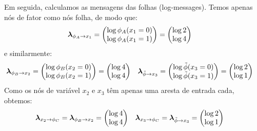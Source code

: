 \begin{exenumerate}
\begin{solution}
        Em seguida, calculamos as mensagens das folhas (log-messages). Temos apenas n\'os de fator como n\'os folha, de modo que:
        \begin{align}
            \boldsymbol{\lambda}_{\phi_A \to x_1} & =  \begin{pmatrix}
                \log \phi_A(x_1=0)\\
                \log \phi_A(x_1=1)
            \end{pmatrix}
            = \begin{pmatrix}
                \log 2\\
                \log 4
            \end{pmatrix}
        \end{align}
        e similarmente:
        \begin{align}
            \boldsymbol{\lambda}_{\phi_B \to x_2} & =   \begin{pmatrix}
                \log \phi_B(x_2=0)\\
                \log \phi_B(x_2=1)
            \end{pmatrix} = \begin{pmatrix}
                \log 4\\
                \log 4
            \end{pmatrix}
            &
            \boldsymbol{\lambda}_{\tilde{\phi} \to x_3} & =   \begin{pmatrix}
                \log \tilde{\phi}(x_3=0)\\
                \log \tilde{\phi}(x_3=1)
            \end{pmatrix}= \begin{pmatrix}
                \log 2\\
                \log 1
            \end{pmatrix}
        \end{align}
        Como os n\'os de vari\'avel $x_2$ e $x_3$ t\^em apenas uma aresta de entrada cada, obtemos:
        \begin{align}
            \lambdab_{x_2 \to \phi_C} = \lambdab_{\phi_B \to x_2} & =  \begin{pmatrix}
                \log 4\\
                \log 4
            \end{pmatrix}
            &
            \lambdab_{x_3 \to \phi_C} = \lambdab_{\tilde{\phi} \to x_3} & =  \begin{pmatrix}
                \log 2\\
                \log 1
            \end{pmatrix}

\end{align}
\end{solution}
\end{exenumerate}
